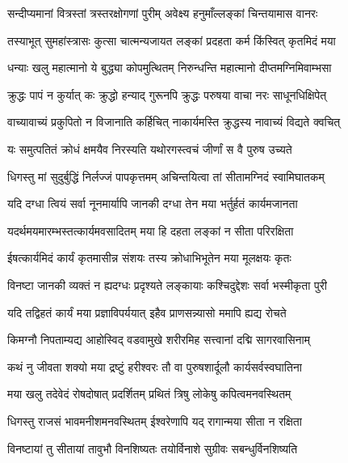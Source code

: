 
\twolineshloka
{सन्दीप्यमानां वित्रस्तां त्रस्तरक्षोगणां पुरीम्}
{अवेक्ष्य हनुमाँल्लङ्कां चिन्तयामास वानरः} %

\twolineshloka
{तस्याभूत् सुमहांस्त्रासः कुत्सा चात्मन्यजायत}
{लङ्कां प्रदहता कर्म किंस्वित् कृतमिदं मया} %

\twolineshloka
{धन्याः खलु महात्मानो ये बुद्ध्या कोपमुत्थितम्}
{निरुन्धन्ति महात्मानो दीप्तमग्निमिवाम्भसा} %

\twolineshloka
{क्रुद्धः पापं न कुर्यात् कः क्रुद्धो हन्याद् गुरूनपि}
{क्रुद्धः परुषया वाचा नरः साधूनधिक्षिपेत्} %

\twolineshloka
{वाच्यावाच्यं प्रकुपितो न विजानाति कर्हिचित्}
{नाकार्यमस्ति क्रुद्धस्य नावाच्यं विद्यते क्वचित्} %

\twolineshloka
{यः समुत्पतितं क्रोधं क्षमयैव निरस्यति}
{यथोरगस्त्वचं जीर्णां स वै पुरुष उच्यते} %

\twolineshloka
{धिगस्तु मां सुदुर्बुद्धिं निर्लज्जं पापकृत्तमम्}
{अचिन्तयित्वा तां सीतामग्निदं स्वामिघातकम्} %

\twolineshloka
{यदि दग्धा त्वियं सर्वा नूनमार्यापि जानकी}
{दग्धा तेन मया भर्तुर्हतं कार्यमजानता} %

\twolineshloka
{यदर्थमयमारम्भस्तत्कार्यमवसादितम्}
{मया हि दहता लङ्कां न सीता परिरक्षिता} %

\twolineshloka
{ईषत्कार्यमिदं कार्यं कृतमासीन्न संशयः}
{तस्य क्रोधाभिभूतेन मया मूलक्षयः कृतः} %

\twolineshloka
{विनष्टा जानकी व्यक्तं न ह्यदग्धः प्रदृश्यते}
{लङ्कायाः कश्चिदुद्देशः सर्वा भस्मीकृता पुरी} %

\twolineshloka
{यदि तद्विहतं कार्यं मया प्रज्ञाविपर्ययात्}
{इहैव प्राणसन्न्यासो ममापि ह्यद्य रोचते} %

\twolineshloka
{किमग्नौ निपताम्यद्य आहोस्विद् वडवामुखे}
{शरीरमिह सत्त्वानां दद्मि सागरवासिनाम्} %

\twolineshloka
{कथं नु जीवता शक्यो मया द्रष्टुं हरीश्वरः}
{तौ वा पुरुषशार्दूलौ कार्यसर्वस्वघातिना} %

\twolineshloka
{मया खलु तदेवेदं रोषदोषात् प्रदर्शितम्}
{प्रथितं त्रिषु लोकेषु कपित्वमनवस्थितम्} %

\twolineshloka
{धिगस्तु राजसं भावमनीशमनवस्थितम्}
{ईश्वरेणापि यद् रागान्मया सीता न रक्षिता} %

\twolineshloka
{विनष्टायां तु सीतायां तावुभौ विनशिष्यतः}
{तयोर्विनाशे सुग्रीवः सबन्धुर्विनशिष्यति} %

